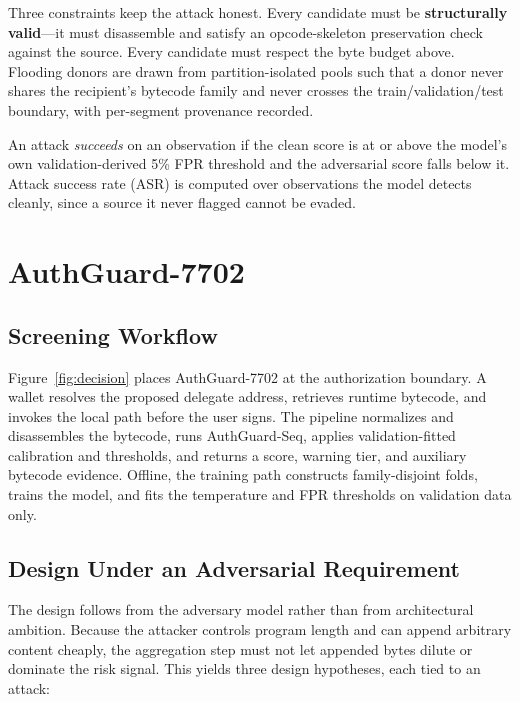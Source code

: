 \documentclass[conference]{IEEEtran}
\begin{document}
Three constraints keep the attack honest. Every candidate must be \textbf{structurally valid}---it must disassemble and satisfy an opcode-skeleton preservation check against the source. Every candidate must respect the byte budget above. Flooding donors are drawn from partition-isolated pools such that a donor never shares the recipient's bytecode family and never crosses the train/validation/test boundary, with per-segment provenance recorded.

An attack \emph{succeeds} on an observation if the clean score is at or above the model's own validation-derived 5\% FPR threshold and the adversarial score falls below it. Attack success rate (ASR) is computed over observations the model detects cleanly, since a source it never flagged cannot be evaded.

\section{AuthGuard-7702}
\label{sec:system}

\subsection{Screening Workflow}

Figure~\ref{fig:decision} places AuthGuard-7702 at the authorization boundary. A wallet resolves the proposed delegate address, retrieves runtime bytecode, and invokes the local path before the user signs. The pipeline normalizes and disassembles the bytecode, runs AuthGuard-Seq, applies validation-fitted calibration and thresholds, and returns a score, warning tier, and auxiliary bytecode evidence. Offline, the training path constructs family-disjoint folds, trains the model, and fits the temperature and FPR thresholds on validation data only.

\subsection{Design Under an Adversarial Requirement}

The design follows from the adversary model rather than from architectural ambition. Because the attacker controls program length and can append arbitrary content cheaply, the aggregation step must not let appended bytes dilute or dominate the risk signal. This yields three design hypotheses, each tied to an attack:
\end{document}
